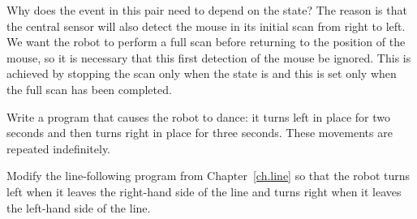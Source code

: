 Why does the event in this pair need to depend on the state? The reason
is that the central sensor will also detect the mouse in its initial
scan from right to left. We want the robot to perform a full scan
before returning to the position of the mouse, so it is necessary that
this first detection of the mouse be ignored. This is achieved by
stopping the scan only when the state is  and this is set only
when the full scan has been completed.


Write a program that causes the robot to dance: it turns left in
place for two seconds and then turns right in place for three seconds.
These movements are repeated indefinitely.


Modify the line-following program from Chapter~\ref{ch.line} so that the
robot turns left when it leaves the right-hand side of the line and
turns right when it leaves the left-hand side of the line.
